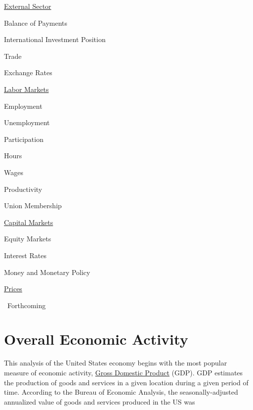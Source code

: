 \documentclass{report}
\begin{document}
\begin{minipage}{0.4\textwidth}
\begin{description}
\item {\hyperref[sec:ext]{External Sector}}
\begin{description}
\item Balance of Payments
\item International Investment Position
\item Trade
\item Exchange Rates
\end{description}
\item {\hyperref[sec:lab]{Labor Markets}}
\begin{description}
\item Employment
\item Unemployment
\item Participation
\item Hours
\item Wages
\item Productivity
\item Union Membership
\end{description}
\item {\hyperref[sec:cap]{Capital Markets}}
\begin{description}
\item Equity Markets
\item Interest Rates
\item Money and Monetary Policy
\end{description}
\item {\hyperref[sec:pr]{Prices}}
\end{description}
\vspace{5cm}

\end{minipage}
\vspace{6mm}

\small * \ Forthcoming

\newpage
\section*{\color{darkgray} \LARGE Overall Economic Activity}
\label{sec:oea}
\begin{minipage}{0.61\textwidth}
\small This analysis of the United States economy begins with the most popular measure of economic activity, \href{https://www.bea.gov/data/gdp/gross-domestic-product}{Gross Domestic Product} (GDP). GDP estimates the production of goods and services in a given location during a given period of time. According to the Bureau of Economic Analysis, the seasonally-adjusted annualized value of goods and services produced in the US was 


\end{minipage}\hfill
\begin{minipage}{0.34\textwidth}

\end{minipage}
\end{document}
